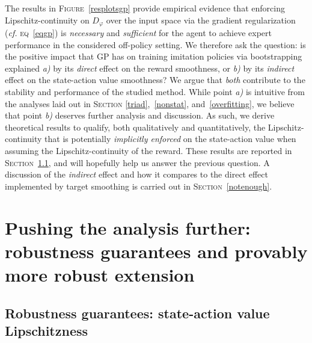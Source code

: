 The results in \textsc{Figure}~\ref{resplotsgp}
provide empirical evidence
that enforcing Lipschitz-continuity on $D_\varphi$
over the input space via the gradient regularization (\textit{cf.} \textsc{eq}~\ref{eqgp})
is \emph{necessary} and \emph{sufficient}
for the agent to achieve expert performance in the considered off-policy setting.
We therefore ask the question:
is the positive impact that GP has on training imitation policies via bootstrapping explained
\textit{a)} by its \emph{direct} effect on the reward smoothness,
or \textit{b)} by its \emph{indirect} effect on the state-action value smoothness?
We argue that \emph{both} contribute to the stability and performance of the studied method.
While point \textit{a)} is intuitive from the analyses laid out in \textsc{Section}
\ref{triad},~\ref{nonstat}, and~\ref{overfitting}, we believe that point
\textit{b)} deserves further analysis and discussion.
As such, we derive theoretical results to qualify, both qualitatively and quantitatively,
the Lipschitz-continuity that is potentially \emph{implicitly enforced} on the state-action value
when assuming the Lipschitz-continuity of the reward.
These results are reported in \textsc{Section}~\ref{theory},
and will hopefully help us answer the previous question.
A discussion of the \emph{indirect} effect and how it compares to the direct effect
implemented by target smoothing is carried out in \textsc{Section}~\ref{notenough}.

\section[%
Pushing the analysis further]{%
Pushing the analysis further: robustness guarantees and provably more robust extension}

\subsection{Robustness guarantees: state-action value Lipschitzness}
\label{theory}

